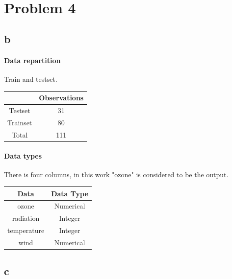 \documentclass[11pt,a4paper,twoside,openright]{report}
\begin{document}
	
	
	
	\newpage
	\section*{Problem 4}
	\subsection*{b}
	
	\paragraph{Data repartition} Train and testset.\\
	
	
	\begin{table}[H]
		\centering
		\begin{tabular}{|c|c|}
			\hline 
			& \textbf{Observations} \\ 
			\hline 
			Testset & 31 \\ 
			\hline 
			Trainset & 80 \\ 
			\hline 
			Total & 111 \\ 
			\hline 
		\end{tabular} 
	\end{table}


\paragraph{Data types}  There is four columns, in this work "ozone" is considered to be the output.\\

	\begin{table}[H]
		\centering
		\begin{tabular}{|c|c|}
			\hline 
			\textbf{Data} & \textbf{Data Type}\\ 
			\hline 
			ozone & Numerical \\ 
			\hline 
			radiation & Integer \\ 
			\hline 
			temperature & Integer \\ 
			\hline 
			wind & Numerical \\ 
			\hline 
		\end{tabular} 
	\end{table}
	
	
	\subsection*{c}
	
\end{document}
